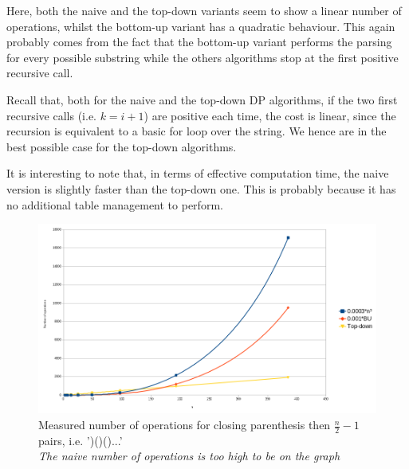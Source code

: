 \documentclass[12pt]{extarticle}
\begin{document}
\begin{multicols}{2}


Here, both the naive and the top-down variants seem to show a linear number of
operations, whilst the bottom-up variant has a quadratic behaviour. This again
probably comes from the fact that the bottom-up variant performs the parsing for
every possible substring while the others algorithms stop at the first positive recursive call.

Recall that, both for the naive and the top-down DP algorithms, if the two first recursive calls (i.e.
$k=i+1$) are positive each time, the cost is linear, since the recursion is
equivalent to a basic for loop over the string. We hence are in the best
possible case for the top-down algorithms.

It is interesting to note that, in terms of effective computation time, the
naive version is slightly faster than the top-down one. This is probably because
it has no additional table management to perform.

\end{multicols}
\newpage
\begin{figure}[h]
  \label{fig:plr}
  \includegraphics[width=\textwidth]{paren/complexity_closing_paren_left_right}
  \caption{Measured number of operations for closing parenthesis then $\frac n2-1$ pairs, i.e. ')()()...'\\
    \textit{The naive number of operations is too high to be on the graph}}
\end{figure}
\end{document}

